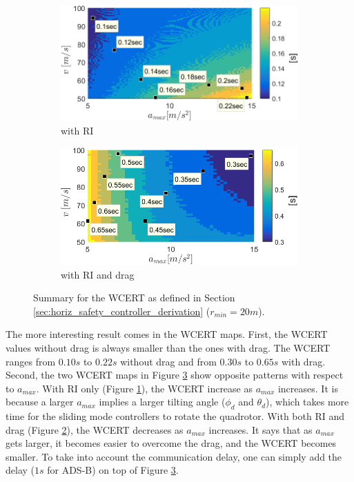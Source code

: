 \documentclass[journal,11pt,onecolumn,draftclsnofoot,]{IEEEtran}
\begin{document}
\begin{figure}
	\centering
	\begin{subfigure}{.48\columnwidth}
		\centering
		\includegraphics[width=\columnwidth]{WCERT_horizontal_RI}
		\caption{with RI}
		\label{fig:WCERT_horiz_RI}
	\end{subfigure}
	\hfill
	\begin{subfigure}{.48\columnwidth}
		\centering
		\includegraphics[width=\columnwidth]{WCERT_horizontal_RI_drag}
		\caption{with RI and drag}
		\label{fig:WCERT_horiz_RI_drag}
	\end{subfigure}
	\caption{Summary for the
		WCERT as defined in Section \ref{sec:horiz_safety_controller_derivation} ($r_{min}=20m$).}
	\label{fig:WCERT_horiz}
\end{figure}

The more interesting result comes in the WCERT maps. First, the WCERT values without drag is always smaller than the ones with drag. The WCERT ranges from $0.10 s$ to $0.22 s$ without drag and from $0.30 s$ to $0.65 s$ with drag. Second, the two WCERT maps in Figure \ref{fig:WCERT_horiz} show opposite patterns with respect to $a_{max}$. With RI only (Figure \ref{fig:WCERT_horiz_RI}), the WCERT increase as $a_{max}$ increases. It is because a larger $a_{max}$ implies a larger tilting angle ($\phi_d$ and $\theta_d$), which takes more time for the sliding mode controllers to rotate the quadrotor. With both RI and drag (Figure \ref{fig:WCERT_horiz_RI_drag}), the WCERT decreases as $a_{max}$ increases. It says that as $a_{max}$ gets larger, it becomes easier to overcome the drag, and the WCERT becomes smaller. To take into account the communication delay, one can simply add the delay ($1s$ for ADS-B) on top of Figure \ref{fig:WCERT_horiz}.
\end{document}
